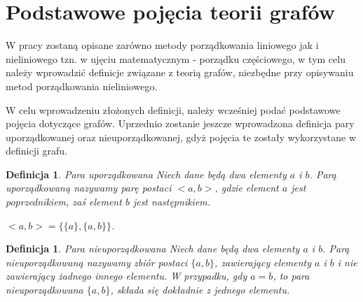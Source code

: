 \documentclass[12pt,a4paper]{report}
\newtheorem{definition}[theorem]{Definicja}
\begin{document}




\section{Podstawowe pojęcia teorii grafów}\label{grafy} %
W pracy zostaną opisane zarówno metody porządkowania liniowego jak i nieliniowego tzn. w ujęciu matematycznym - porządku częściowego, w tym celu należy wprowadzić definicje związane z teorią grafów, niezbędne przy opisywaniu metod porządkowania nieliniowego.


W celu wprowadzeniu złożonych definicji, należy wcześniej podać podstawowe pojęcia dotyczące grafów. Uprzednio zostanie jeszcze wprowadzona definicja pary uporządkowanej oraz nieuporządkowanej, gdyż pojęcia te zostały wykorzystane w definicji grafu.



\begin{definition}{Para uporządkowana \cite[w oparciu o rozdział 3]{kuratowski2004}}
Niech dane będą dwa elementy $a$ i $b$. Parą uporządkowaną nazywamy parę postaci $<a,b>$, gdzie element $a$ jest poprzednikiem, zaś element $b$ jest następnikiem. 

$<a,b>=\{\{a\},\{a,b\}\}$.

\end{definition}

\begin{definition}{Para nieuporządkowana \cite[w oparciu o rozdział 3]{kuratowski2004}}
Niech dane będą dwa elementy $a$ i $b$. Parą nieuporządkowaną nazywamy zbiór postaci $\{a,b\}$, zawierający elementy $a$ i $b$ i nie zawierający żadnego innego elementu. W przypadku, gdy $a=b$, to para nieuporządkowana $\{a,b\}$, składa się dokładnie z jednego elementu.
\end{definition}
\end{document}
